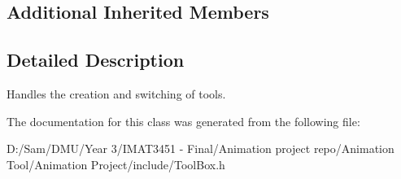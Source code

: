 \subsection*{Additional Inherited Members}


\subsection{Detailed Description}
Handles the creation and switching of tools. 

The documentation for this class was generated from the following file\+:\begin{DoxyCompactItemize}
\item 
D\+:/\+Sam/\+D\+M\+U/\+Year 3/\+I\+M\+A\+T3451 -\/ Final/\+Animation project repo/\+Animation Tool/\+Animation Project/include/Tool\+Box.\+h\end{DoxyCompactItemize}
